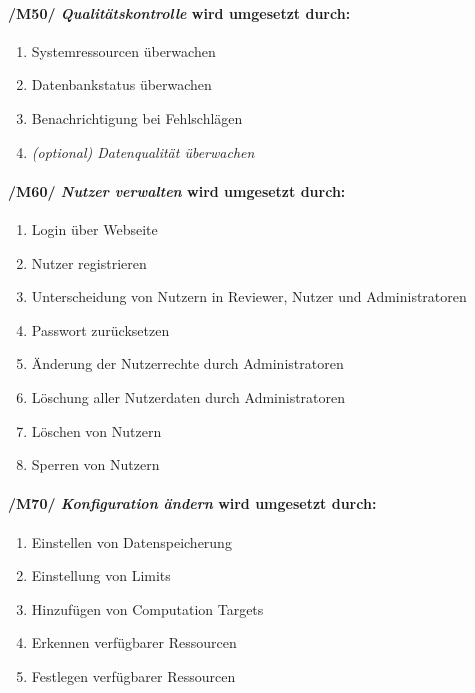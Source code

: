 \paragraph{/M50/ \textit{Qualitätskontrolle} wird umgesetzt durch:}

\begin{enumerate}
    \setlength\itemsep{-1em}
    \setcounter{enumi}{\value{FAs}}
    \item Systemressourcen überwachen %
    \item Datenbankstatus überwachen
    \item Benachrichtigung bei Fehlschlägen
    \item \textit{(optional) Datenqualität überwachen}
    \setcounter{FAs}{\value{enumi}}
\end{enumerate}
    
\paragraph{/M60/ \textit{Nutzer verwalten} wird umgesetzt durch:}

\begin{enumerate}
    \setlength\itemsep{-1em}
    \setcounter{enumi}{\value{FAs}}
    \item Login über Webseite
    \item Nutzer registrieren
    \item Unterscheidung von Nutzern in Reviewer, Nutzer und Administratoren
    \item Passwort zurücksetzen
    \item Änderung der Nutzerrechte durch Administratoren
    \item Löschung aller Nutzerdaten durch Administratoren
    \item Löschen von Nutzern
    \item Sperren von Nutzern %
    \setcounter{FAs}{\value{enumi}}
\end{enumerate}
    
\paragraph{/M70/ \textit{Konfiguration ändern} wird umgesetzt durch:}

\begin{enumerate}
    \setlength\itemsep{-1em}
    \setcounter{enumi}{\value{FAs}}
    \item Einstellen von Datenspeicherung
    \item Einstellung von Limits %
    \item Hinzufügen von Computation Targets %
    \item Erkennen verfügbarer Ressourcen
    \item Festlegen verfügbarer Ressourcen
\end{enumerate}